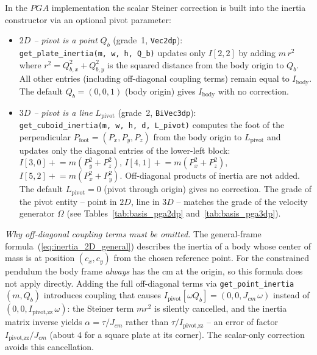 In the $PGA$ implementation the scalar Steiner correction is built into the inertia
constructor via an optional pivot parameter:
\begin{itemize}
    \item \emph{$2D$ -- pivot is a point} $Q_b$ (grade~1, \texttt{Vec2dp}): \\
    \texttt{get\_plate\_inertia(m, w, h, Q\_b)} updates only $I[2,2]$ by adding
    $m\,r^2$ where $r^2 = Q_{b,x}^2 + Q_{b,y}^2$ is the squared distance from the
    body origin to $Q_b$. All other entries (including off-diagonal coupling terms)
    remain equal to $I_\text{body}$. The default $Q_b = (0,0,1)$ (body origin) gives
    $I_\text{body}$ with no correction.
    \item \emph{$3D$ -- pivot is a line} $L_\text{pivot}$ (grade~2, \texttt{BiVec3dp}): \\
    \texttt{get\_cuboid\_inertia(m, w, h, d, L\_pivot)} computes the foot of the
    perpendicular $P_\text{foot} = (P_x, P_y, P_z)$ from the body origin to
    $L_\text{pivot}$ and updates only the diagonal entries of the lower-left block:
    $I[3,0] \mathrel{+}= m(P_y^2+P_z^2)$, $I[4,1] \mathrel{+}= m(P_x^2+P_z^2)$,
    $I[5,2] \mathrel{+}= m(P_x^2+P_y^2)$. Off-diagonal products of inertia are not
    added. The default $L_\text{pivot} = 0$ (pivot through origin) gives no correction.
    The grade of the pivot entity -- point in $2D$, line in $3D$ -- matches the grade of
    the velocity generator $\Omega$ (see Tables~\ref{tab:basis_pga2dp}
    and~\ref{tab:basis_pga3dp}).
\end{itemize}

\emph{Why off-diagonal coupling terms must be omitted.}
The general-frame formula~(\ref{eq:inertia_2D_general}) describes the inertia of a body
whose center of mass is at position $(c_x, c_y)$ from the chosen reference point.  For the
constrained pendulum the body frame \emph{always} has the cm at the origin, so this
formula does not apply directly.  Adding the full off-diagonal terms via
\texttt{get\_point\_inertia}$(m, Q_b)$ introduces coupling that causes
$I_\text{pivot}[\omega Q_b] = (0,0,J_{cm}\,\omega)$ instead of \\
$(0,0,I_\text{pivot,zz}\,\omega)$: the Steiner term $mr^2$ is silently cancelled, and the
inertia matrix inverse yields $\alpha = \tau/J_{cm}$ rather than $\tau/I_\text{pivot,zz}$
-- an error of factor $I_\text{pivot,zz}/J_{cm}$ (about $4$ for a square plate at its
corner). The scalar-only correction avoids this cancellation. \\

